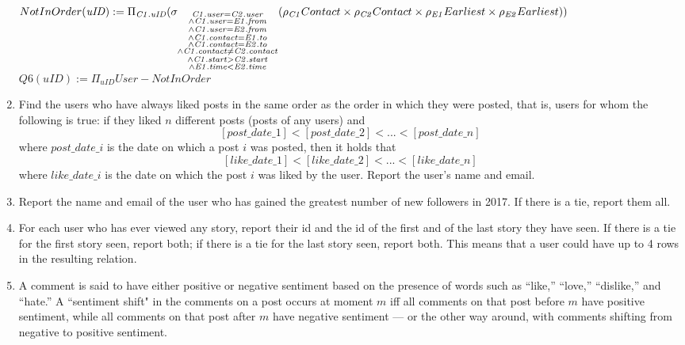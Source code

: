 \documentclass{article}
\newcommand{\var}[1]{\mathit{#1}}
\begin{document}
\begin{enumerate}
{$
NotInOrder(\var{uID}) := \\ [5pt]
	\Pi_{\var{C1.uID}}
	(\sigma_{\substack{\var{C1.user} = \var{C2.user} \\
		\wedge \var{C1.user} = \var{E1.from} \\
		\wedge \var{C1.user} = \var{E2.from} \\
		\wedge \var{C1.contact} = \var{E1.to} \\
		\wedge \var{C1.contact} = \var{E2.to} \\
		\wedge \var{C1.contact} \neq \var{C2.contact} \\
		\wedge \var{C1.start} > \var{C2.start} \\
		\wedge \var{E1.time} < \var{E2.time}}}
		(\rho_{\var{C1}} Contact \times \rho_{\var{C2}} Contact
		\times \rho_{\var{E1}} Earliest \times \rho_{\var{E2}} Earliest)) \\ [5pt]
$
$
Q6(uID) := 
	\Pi_{\var{uID}} User - NotInOrder
$
}
\item   %
Find the users who have always liked posts
in the same order as the order in which they were posted,
that is,
users for whom the following is true:
if they liked $n$ different posts (posts of any users)
and
$$[post\_date\_1] < [post\_date\_2] < ... < [post\_date\_n]$$
where $post\_date\_i$ is the date on which a post $i$ was posted, 
then it holds that
$$[like\_date\_1] < [like\_date\_2] < ... < [like\_date\_n]$$ 
where $like\_date\_i$ is the date on which the post $i$ was liked 
by the user.  
Report the user's name and email.

\item   %
Report the name and email of the user
who has gained the greatest number of new followers in 2017. 
If there is a tie, report them all.

\item   %
For each user who has ever viewed any story, 
	report their id and the id of the first and of the last story they have seen.
If there is a tie for the first story seen, report both;
if there is a tie for the last story seen, report both.
This means that a user could have up to 4 rows in the resulting relation.

\item   %
A comment is said to have either positive or negative sentiment
based on the presence of words such as ``like,'' ``love,'' ``dislike,'' and ``hate.'' 
A ``sentiment shift" in the comments on a post occurs at moment $m$ iff
all comments on that post before $m$ have positive sentiment, 
while all comments on that post after $m$ have negative sentiment ---
or the other way around, with comments shifting from negative to positive sentiment.


\end{enumerate}
\end{document}
